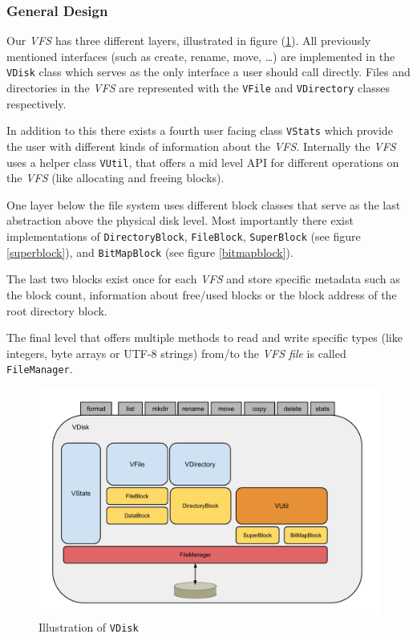 \documentclass[a4paper,12pt]{article}
\begin{document}
\subsubsection{General Design}
Our \emph{VFS} has three different layers, illustrated in figure (\ref{abstactVdisk}).
All previously mentioned interfaces (such as create, rename, move, \dots) are implemented in the \texttt{VDisk} class which serves as the only interface a user should call directly. Files and directories in the \emph{VFS} are represented with the \texttt{VFile} and \texttt{VDirectory} classes respectively.

In addition to this there exists a fourth user facing class \texttt{VStats} which provide the user with different kinds of information about the \emph{VFS}.
Internally the \emph{VFS} uses a helper class \texttt{VUtil}, that offers a mid level API for different operations on the \emph{VFS} (like allocating and freeing blocks).

One layer below the file system uses different block classes that serve as the last abstraction above the physical disk level. Most importantly there exist implementations of \texttt{DirectoryBlock}, \texttt{FileBlock}, \texttt{SuperBlock} (see figure \ref{superblock}), and \texttt{BitMapBlock} (see figure \ref{bitmapblock}).

The last two blocks exist once for each \emph{VFS} and store specific metadata such as the block count, information about free/used blocks or the block address of the root directory block.

The final level that offers multiple methods to read and write specific types (like integers, byte arrays or UTF-8 strings) from/to the \emph{VFS file} is called \texttt{FileManager}.

\begin{figure}[h]
\begin{center}
\includegraphics[scale=0.4]{images/AVDisk.pdf}
\caption{Illustration of \texttt{VDisk}}
\label{abstactVdisk}
\end{center}
\end{figure}
\end{document}
